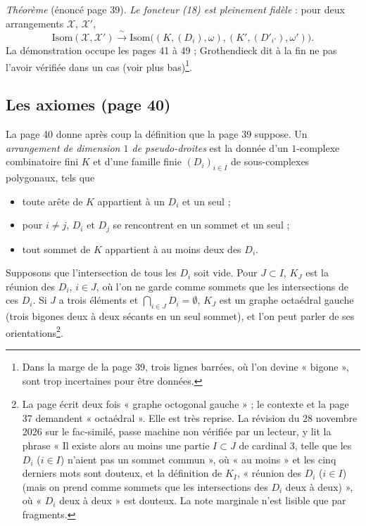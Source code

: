 \documentclass[11pt,a4paper]{article}
\begin{document}
\emph{Théorème} (énoncé page 39). \emph{Le foncteur (18) est pleinement
fidèle} : pour deux arrangements $\mathcal{X}$, $\mathcal{X}'$,
\[
\mathrm{Isom}(\mathcal{X}, \mathcal{X}') \xrightarrow{\ \sim\ }
\mathrm{Isom}\bigl((K, (D_i), \omega), (K', (D'_{i'}), \omega')\bigr).
\]
La démonstration occupe les pages 41 à 49 ; Grothendieck dit à la fin ne pas
l'avoir vérifiée dans un cas (voir plus bas)\footnote{Dans la marge de la
page 39, trois lignes barrées, où l'on devine « bigone », sont trop
incertaines pour être données.}.

\subsection*{Les axiomes (page 40)}

La page 40 donne après coup la définition que la page 39 suppose. Un
\emph{arrangement de dimension $1$ de pseudo-droites} est la donnée d'un
$1$-complexe combinatoire fini $K$ et d'une famille finie $(D_i)_{i \in I}$ de
sous-complexes polygonaux, tels que
\begin{itemize}
  \item toute arête de $K$ appartient à un $D_i$ et un seul ;
  \item pour $i \neq j$, $D_i$ et $D_j$ se rencontrent en un sommet et un seul ;
  \item tout sommet de $K$ appartient à au moins deux des $D_i$.
\end{itemize}
Supposons que l'intersection de tous les $D_i$ soit vide. Pour $J \subset I$,
$K_J$ est la réunion des $D_i$, $i \in J$, où l'on ne garde comme sommets que
les intersections de ces $D_i$. Si $J$ a trois éléments et $\bigcap_{i \in J}
D_i = \emptyset$, $K_J$ est un graphe octaédral gauche (trois bigones
deux à deux sécants en un seul sommet), et l'on peut parler de ses
orientations\footnote{La page écrit deux fois « graphe octogonal gauche » ;
le contexte et la page 37 demandent « octaédral ». Elle est très reprise. La
révision du 28 novembre 2026 sur le fac-similé, passe machine non vérifiée par un lecteur,
y lit la phrase « Il existe alors au moins une partie $I \subset J$ de
cardinal $3$, telle que les $D_i$ ($i \in I$) n'aient pas un sommet commun »,
où « au moins » et les cinq derniers mots sont douteux, et la définition de
$K_I$, « réunion des $D_i$ ($i \in I$) (mais on prend comme sommets que les
intersections des $D_i$ deux à deux) », où « $D_i$ deux à deux » est douteux.
La note marginale n'est lisible que par fragments.}.
\end{document}
